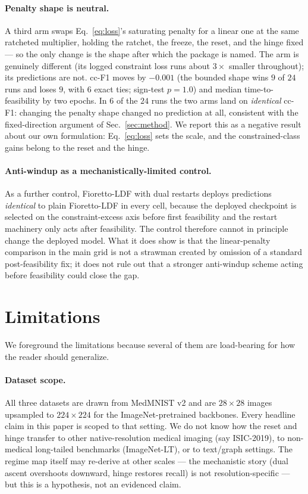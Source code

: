 \documentclass[10pt]{article}
\begin{document}
\paragraph{Penalty shape is neutral.}
A third arm swaps Eq.~\eqref{eq:loss}'s saturating penalty for a linear
one at the same ratcheted multiplier, holding the ratchet, the freeze,
the reset, and the hinge fixed --- so the only change is the shape after
which the package is named. The arm is genuinely different (its logged
constraint loss runs about $3\times$ smaller throughout); its
predictions are not. cc-F1 moves by $-0.001$ (the bounded shape wins $9$
of $24$ runs and loses $9$, with $6$ exact ties; sign-test $p{=}1.0$)
and median time-to-feasibility by two epochs. In $6$ of the $24$ runs the
two arms land on \emph{identical} cc-F1: changing the penalty shape
changed no prediction at all, consistent with the fixed-direction
argument of Sec.~\ref{sec:method}. We report this as a negative result
about our own formulation: %
{Eq.~\eqref{eq:loss} sets the scale, and the constrained-class
gains belong to the reset and the hinge.}

\paragraph{Anti-windup as a mechanistically-limited control.}
As a further control, Fioretto-LDF with dual restarts
\citep{gallego2022controlled} deploys predictions \emph{identical} to
plain Fioretto-LDF in every cell, because the deployed checkpoint is
selected on the constraint-excess axis before first feasibility and the
restart machinery only acts after feasibility. The control therefore
cannot in principle change the deployed model. What it does show is that
the linear-penalty comparison in the main grid is not a strawman created
by omission of a standard post-feasibility fix; it does not rule out
that a stronger anti-windup scheme acting before feasibility could close
the gap.

\section{Limitations}
\label{sec:limits}

We foreground the limitations because several of them are load-bearing for
how the reader should generalize.

\paragraph{Dataset scope.}
All three datasets are drawn from MedMNIST v2 and are $28{\times}28$
images upsampled to $224{\times}224$ for the ImageNet-pretrained
backbones. Every headline claim in this paper is scoped to that setting.
{We do not know how the reset and hinge transfer to other
native-resolution medical imaging (say ISIC-2019), to non-medical}
long-tailed benchmarks (ImageNet-LT), or to text/graph settings. The
regime map itself may re-derive at other scales --- the mechanistic story
(dual ascent overshoots downward, hinge restores recall) is not
resolution-specific --- but this is a hypothesis, not an evidenced claim.
\end{document}
